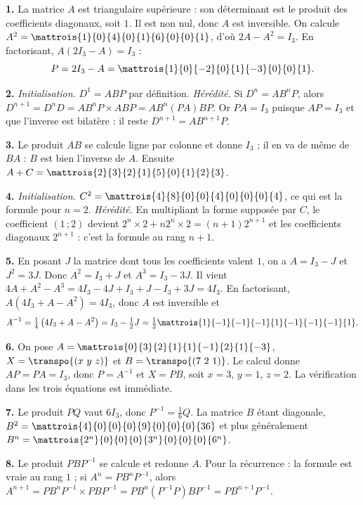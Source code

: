 \begin{corrige}[annales]
\textbf{1.} La matrice $A$ est triangulaire supérieure : son déterminant est
le produit des coefficients diagonaux, soit $1$. Il est non nul, donc $A$ est
inversible. On calcule $A^{2} = \mattrois{1}{0}{4}{0}{1}{6}{0}{0}{1}$, d'où
$2A-A^{2} = I_{3}$. En factorisant, $A\left(2I_{3}-A\right) = I_{3}$ :
\[
  P = 2I_{3}-A = \mattrois{1}{0}{-2}{0}{1}{-3}{0}{0}{1}.
\]

\textbf{2.} \emph{Initialisation.} $D^{1} = ABP$ par définition.
\emph{Hérédité.} Si $D^{n} = AB^{n}P$, alors
$D^{n+1} = D^{n}D = AB^{n}P \times ABP = AB^{n}\left(PA\right)BP$. Or
$PA = I_{3}$ puisque $AP = I_{3}$ et que l'inverse est bilatère : il reste
$D^{n+1} = AB^{n+1}P$.

\textbf{3.} Le produit $AB$ se calcule ligne par colonne et donne $I_{3}$ ; il
en va de même de $BA$ : $B$ est bien l'inverse de $A$. Ensuite
$A+C = \mattrois{2}{3}{2}{1}{5}{0}{1}{2}{3}$.

\textbf{4.} \emph{Initialisation.} $C^{2} = \mattrois{4}{8}{0}{0}{4}{0}{0}{0}{4}$,
ce qui est la formule pour $n = 2$. \emph{Hérédité.} En multipliant la forme
supposée par $C$, le coefficient $(1\,;2)$ devient
$2^{n}\times2+n2^{n}\times2 = (n+1)2^{n+1}$ et les coefficients diagonaux
$2^{n+1}$ : c'est la formule au rang $n+1$.

\textbf{5.} En posant $J$ la matrice dont tous les coefficients valent $1$, on
a $A = I_{3}-J$ et $J^{2} = 3J$. Donc
$A^{2} = I_{3}+J$ et $A^{3} = I_{3}-3J$. Il vient
$4A+A^{2}-A^{3} = 4I_{3}-4J+I_{3}+J-I_{3}+3J = 4I_{3}$. En factorisant,
$A\left(4I_{3}+A-A^{2}\right) = 4I_{3}$, donc $A$ est inversible et
\[
  A^{-1} = \tfrac14\left(4I_{3}+A-A^{2}\right) = I_{3}-\tfrac12 J
  = \tfrac12\mattrois{1}{-1}{-1}{-1}{1}{-1}{-1}{-1}{1}.
\]

\textbf{6.} On pose $A = \mattrois{0}{3}{2}{1}{1}{-1}{2}{1}{-3}$,
$X = \transpo{(x\ y\ z)}$ et $B = \transpo{(7\ 2\ 1)}$. Le calcul donne
$AP = PA = I_{3}$, donc $P = A^{-1}$ et $X = PB$, soit $x = 3$, $y = 1$,
$z = 2$. La vérification dans les trois équations est immédiate.

\textbf{7.} Le produit $PQ$ vaut $6I_{3}$, donc $P^{-1} = \frac16 Q$. La
matrice $B$ étant diagonale, $B^{2} = \mattrois{4}{0}{0}{0}{9}{0}{0}{0}{36}$
et plus généralement
$B^{n} = \mattrois{2^{n}}{0}{0}{0}{3^{n}}{0}{0}{0}{6^{n}}$.

\textbf{8.} Le produit $PBP^{-1}$ se calcule et redonne $A$. Pour la
récurrence : la formule est vraie au rang $1$ ; si $A^{n} = PB^{n}P^{-1}$,
alors
$A^{n+1} = PB^{n}P^{-1}\times PBP^{-1} = PB^{n}\left(P^{-1}P\right)BP^{-1}
= PB^{n+1}P^{-1}$.
\end{corrige}


